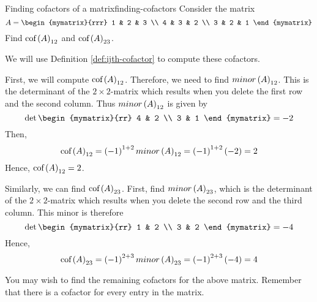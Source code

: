 \begin{example}{Finding cofactors of a matrix}{finding-cofactors}
Consider the matrix
\begin{equation*}
A=\begin{mymatrix}{rrr}
1 & 2 & 3 \\
4 & 3 & 2 \\
3 & 2 & 1
\end{mymatrix} 
\end{equation*}
Find $\mbox{\rm cof}\left(A\right) _{12}$ and $\mbox{\rm cof}\left(A\right) _{23}$.
\end{example}

\begin{solution} We will use Definition \ref{def:ijth-cofactor} to compute these cofactors. 

First, we will compute $\mbox{\rm cof}\left(A\right) _{12}$. 
Therefore, we need to find $minor\left(A\right)_{12}$. This is the determinant of the $2\times 2$-matrix
which results when you delete the first row and the second column. Thus $minor\left(A\right)_{12}$ is given by 
\begin{equation*}
\det \begin{mymatrix}{rr}
4 & 2 \\
3 & 1
\end{mymatrix} = -2
\end{equation*}
Then,
\begin{equation*}
\mbox{\rm cof}\left(A\right) _{12}=\left(-1\right) ^{1+2} minor\left(A\right)_{12} =\left(-1\right) ^{1+2}\left(-2\right) =2
\end{equation*}
Hence, $\mbox{\rm cof}\left(A\right) _{12}=2$.

Similarly, we can find $\mbox{\rm cof}\left(A\right) _{23}$. First, find $minor\left(A\right)_{23}$, which is the determinant of the $2\times 2$-matrix
which results when you delete the second row and the third column. This
minor is therefore
\begin{equation*}
\det \begin{mymatrix}{rr}
1 & 2 \\
3 & 2
\end{mymatrix} = -4
\end{equation*}
Hence,
\begin{equation*}
\mbox{\rm cof}\left(A\right) _{23}=\left(-1\right) ^{2+3} minor\left(A\right)_{23} =\left(-1\right) ^{2+3}\left(-4\right) =4
\end{equation*}
\end{solution}

You may wish to find the remaining cofactors for the above matrix. Remember that there is a cofactor 
for every entry in the matrix.  

